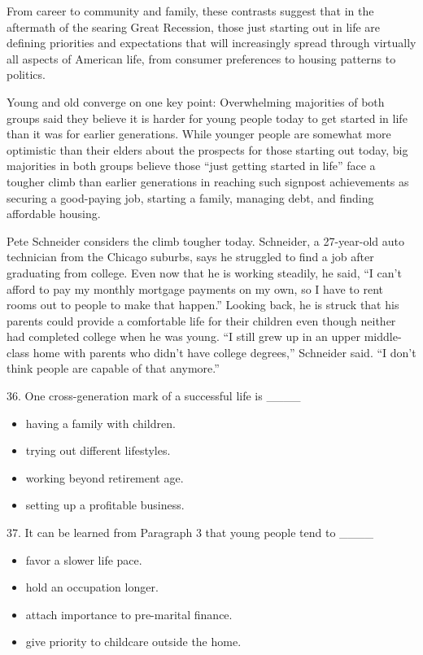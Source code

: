 \documentclass[UTF8,11pt]{ctexart}
\begin{document}
From career to community and family, these contrasts suggest that in the aftermath of the searing Great Recession, those just starting out in life are defining priorities and expectations that will increasingly spread through virtually all aspects of American life, from consumer preferences to housing patterns to politics.


Young and old converge on one key point: Overwhelming majorities of both groups said they believe it is harder for young people today to get started in life than it was for earlier generations. While younger people are somewhat more optimistic than their elders about the prospects for those starting out today, big majorities in both groups believe those “just getting started in life” face a tougher climb than earlier generations in reaching such signpost achievements as securing a good-paying job, starting a family, managing debt, and finding affordable housing.


Pete Schneider considers the climb tougher today. Schneider, a 27-year-old auto technician from the Chicago suburbs, says he struggled to find a job after graduating from college. Even now that he is working steadily, he said, “I can’t afford to pay my monthly mortgage payments on my own, so I have to rent rooms out to people to make that happen.” Looking back, he is struck that his parents could provide a comfortable life for their children even though neither had completed college when he was young. “I still grew up in an upper middle-class home with parents who didn’t have college degrees,” Schneider said. “I don’t think people are capable of that anymore.”


36. One cross-generation mark of a successful life is \_\_\_\_


\begin{itemize}[leftmargin=2em,itemsep=.2em,topsep=.4em]\item[A.] having a family with children.
\item[B.] trying out different lifestyles.
\item[C.] working beyond retirement age.
\item[D.] setting up a profitable business.
\end{itemize}

37. It can be learned from Paragraph 3 that young people tend to \_\_\_\_


\begin{itemize}[leftmargin=2em,itemsep=.2em,topsep=.4em]\item[A.] favor a slower life pace.
\item[B.] hold an occupation longer.
\item[C.] attach importance to pre-marital finance.
\item[D.] give priority to childcare outside the home.
\end{itemize}
\end{document}

